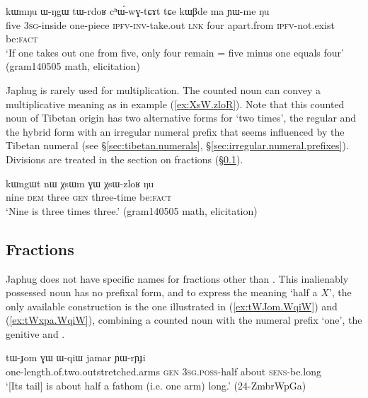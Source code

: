 \begin{exe}
\ex \label{ex:tWrdoR.chWwGtCAt}
\gll kɯmŋu ɯ-ŋgɯ tɯ-rdoʁ cʰɯ́-wɣ-tɕɤt tɕe kɯβde ma ɲɯ-me ŋu \\
 five \textsc{3sg}-inside one-piece \textsc{ipfv}-\textsc{inv}-take.out \textsc{lnk} four apart.from \textsc{ipfv}-not.exist be:\textsc{fact} \\
\glt `If one takes out one from five, only four remain = five minus one equals four' (gram140505 math, elicitation)
\end{exe}

Japhug is rarely used for multiplication. The counted noun  can convey a multiplicative meaning  as in example (\ref{ex:XsW.zloR}). Note that this counted noun of Tibetan origin has two alternative forms for `two times', the regular   and the hybrid form  with an irregular numeral prefix that seems influenced by the Tibetan numeral  (see §\ref{sec:tibetan.numerals}, §\ref{sec:irregular.numeral.prefixes}). Divisions are treated in the section on fractions (§\ref{sec:fractions}).

\begin{exe}
\ex \label{ex:XsW.zloR}
\gll  kɯngɯt nɯ χsɯm ɣɯ χsɯ-zloʁ ŋu \\
 nine \textsc{dem} three \textsc{gen} three-time be:\textsc{fact} \\
\glt `Nine is three times three.' (gram140505 math, elicitation)
\end{exe}
 
 
\subsection{Fractions} \label{sec:fractions}
Japhug does not have specific names for fractions other than .  This inalienably possessed noun has no prefixal form, and to express the meaning `half a $X$', the only available construction is the one illustrated in (\ref{ex:tWJom.WqiW}) and (\ref{ex:tWxpa.WqiW}), combining a counted noun with the numeral prefix `one', the genitive  and .


\begin{exe}
\ex \label{ex:tWJom.WqiW}
\gll tɯ-ɟom ɣɯ ɯ-qiɯ jamar ɲɯ-rɲɟi \\
one-length.of.two.outstretched.arms \textsc{gen} \textsc{3sg}.\textsc{poss}-half about \textsc{sens}-be.long \\
\glt `[Its tail] is about half a fathom (i.e. one arm) long.' (24-ZmbrWpGa)
\end{exe}

